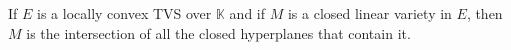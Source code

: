 If $E$ is a locally convex TVS over $\mathbb{K}$ and if $M$ is a closed linear variety in $E$, then $M$ is the intersection of all the closed hyperplanes that contain it.